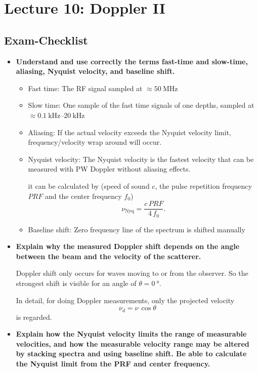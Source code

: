 \documentclass[10pt,a4paper,noendnumber=true]{scrartcl}
\begin{document}
\newpage
\section{Lecture 10: Doppler II}

\subsection{Exam-Checklist}
\begin{itemize}
\item \textbf{Understand and use correctly the terms fast-time and slow-time, aliasing, Nyquist velocity, and baseline shift.}
\begin{itemize}
\item Fast time: The RF signal sampled at $\approx \SI{50}{\MHz}$
\item Slow time: One sample of the fast time signals of one depths, sampled at $\approx \SIrange{0.1}{20}{\kHz}$
\item Aliasing: If the actual velocity exceeds the Nyquist velocity limit, frequency/velocity wrap around will occur. 
\item Nyquist velocity:
The Nyquist velocity is the fastest velocity that can be measured with PW Doppler without aliasing effects.

it can be calculated by (speed of sound $c$, the pulse repetition frequency $PRF$ and the center frequency $f_0$)
\begin{equation}
\nu_\text{Nyq} = \frac{c\,PRF}{4\,f_0}.
\end{equation}
\item Baseline shift: Zero frequency line of the spectrum is shifted manually
\end{itemize}



\item \textbf{Explain why the measured Doppler shift depends on the angle between the beam and the velocity of the scatterer.}

Doppler shift only occurs for waves moving to or from the observer. So the strongest shift is visible for an angle of $\theta=\SI{0}{\degree}$.

In detail, for doing Doppler measurements, only the projected velocity
\begin{equation}
\nu_d=\nu \, \cos \theta
\end{equation}
is regarded.

\item \textbf{Explain how the Nyquist velocity limits the range of measurable velocities, and how the measurable velocity range may be altered by stacking spectra and using baseline shift. Be able to calculate the Nyquist limit from the PRF and center frequency.}


\end{itemize}
\end{document}
